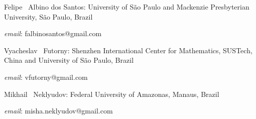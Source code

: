 \documentclass[review,nopreprintline]{elsarticle}
\theoremstyle{definition}
\numberwithin{equation}{section}
\theoremstyle{remark}
\begin{document}
	\bigskip
	
	  Felipe ~Albino dos Santos: University of S\~ao Paulo and Mackenzie Presbyterian University, S\~ao Paulo, Brazil\par\nopagebreak
	  \textit{email}: falbinosantos@gmail.com
	
	  Vyacheslav ~Futorny: Shenzhen International Center for Mathematics, SUSTech, China and University of S\~ao Paulo, Brazil\par\nopagebreak
	  \textit{email}: vfutorny@gmail.com
	
	  Mikhail ~Neklyudov: Federal University of Amazonas, Manaus, Brazil\par\nopagebreak
	  \textit{email}: misha.neklyudov@gmail.com
\end{document}
